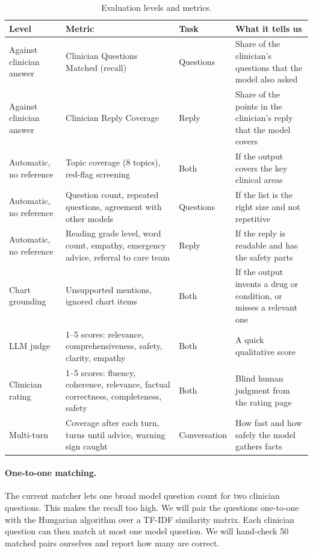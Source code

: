 \documentclass[11pt]{article}
\begin{document}
\begin{table}[t]
\centering\small
\begin{tabularx}{\textwidth}{@{}L{2.9cm}L{5.4cm}L{1.9cm}Y@{}}
\toprule
\textbf{Level} & \textbf{Metric} & \textbf{Task} & \textbf{What it tells us} \\
\midrule
Against clinician answer & Clinician Questions Matched (recall) & Questions & Share of the clinician's questions that the model also asked \\
Against clinician answer & Clinician Reply Coverage & Reply & Share of the points in the clinician's reply that the model covers \\
Automatic, no reference & Topic coverage (8 topics), red-flag screening & Both & If the output covers the key clinical areas \\
Automatic, no reference & Question count, repeated questions, agreement with other models & Questions & If the list is the right size and not repetitive \\
Automatic, no reference & Reading grade level, word count, empathy, emergency advice, referral to care team & Reply & If the reply is readable and has the safety parts \\
Chart grounding & Unsupported mentions, ignored chart items & Both & If the output invents a drug or condition, or misses a relevant one \\
LLM judge & 1--5 scores: relevance, comprehensiveness, safety, clarity, empathy & Both & A quick qualitative score \\
Clinician rating & 1--5 scores: fluency, coherence, relevance, factual correctness, completeness, safety & Both & Blind human judgment from the rating page \\
Multi-turn & Coverage after each turn, turns until advice, warning sign caught & Conversation & How fast and how safely the model gathers facts \\
\bottomrule
\end{tabularx}
\caption{Evaluation levels and metrics.}
\label{tab:eval}
\end{table}

\paragraph{One-to-one matching.}
The current matcher lets one broad model question count for two clinician questions.
This makes the recall too high.
We will pair the questions one-to-one with the Hungarian algorithm over a TF-IDF similarity matrix.
Each clinician question can then match at most one model question.
We will hand-check 50 matched pairs ourselves and report how many are correct.
\end{document}
